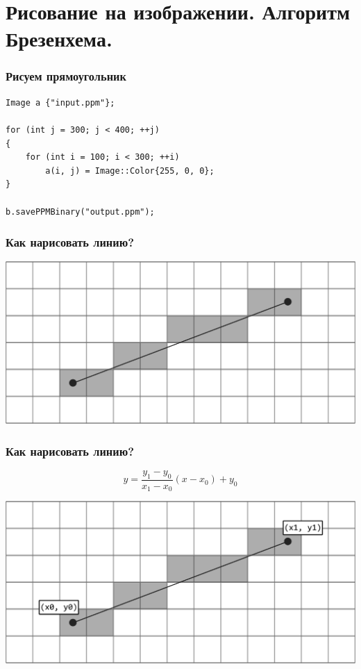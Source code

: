 \documentclass[10pt,pdf,hyperref={unicode}]{beamer}
\begin{document}
\section*{Рисование на изображении. Алгоритм Брезенхема.}

\begin{frame}[fragile]
\frametitle{Рисуем прямоугольник} 
\begin{lstlisting}
Image a {"input.ppm"};

for (int j = 300; j < 400; ++j)
{
    for (int i = 100; i < 300; ++i)
        a(i, j) = Image::Color{255, 0, 0};
}

b.savePPMBinary("output.ppm");
\end{lstlisting}
\end{frame}


\begin{frame}[fragile]
\frametitle{Как нарисовать линию?} 
\begin{center}
\includegraphics[scale=0.75]{./images/bresenham.png}
\end{center}
\end{frame}


\begin{frame}[fragile]
\frametitle{Как нарисовать линию?} 
$$
y = \frac{y_1 - y_0}{x_1 - x_0} (x - x_0) + y_0
$$
\begin{center}
\includegraphics[scale=0.75]{./images/bresenham_xy.png}
\end{center}
\end{frame}
\end{document}
